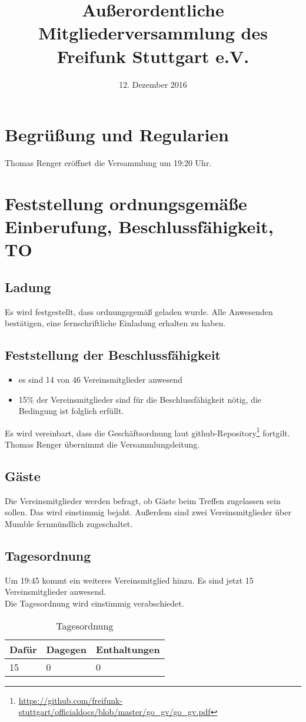 \documentclass[a4paper]{scrartcl}
\date{12. Dezember 2016}
\title{Außerordentliche Mitgliederversammlung des Freifunk Stuttgart e.V.}
\begin{document}
\maketitle

\tableofcontents

\clearpage

\listoftables

\clearpage

\section{Begrüßung und Regularien}
Thomas Renger eröffnet die Versammlung um 19:20 Uhr.

\section{Feststellung ordnungsgemäße Einberufung, Beschlussfähigkeit, TO}
\subsection{Ladung}
Es wird festgestellt, dass ordnungsgemäß geladen wurde. Alle Anwesenden bestätigen, eine fernschriftliche Einladung erhalten zu haben.

\subsection{Feststellung der Beschlussfähigkeit}
\begin{itemize}
\item es sind 14 von 46 Vereinsmitglieder anwesend
\item 15\% der Vereinsmitglieder sind für die Beschlussfähigkeit nötig, die Bedingung ist folglich erfüllt.
\end{itemize}
Es wird vereinbart, dass die Geschäftsordnung laut github-Repository\footnote{\url{https://github.com/freifunk-stuttgart/officialdocs/blob/master/go_gv/go_gv.pdf}} fortgilt. Thomas Renger übernimmt die Versammlungsleitung.

\subsection{Gäste} 
Die Vereinsmitglieder werden befragt, ob Gäste beim Treffen zugelassen sein sollen. Das wird einstimmig bejaht. Außerdem sind zwei Vereinsmitglieder über Mumble fernmündlich zugeschaltet.

\subsection{Tagesordnung}
Um 19:45 kommt ein weiteres Vereinsmitglied hinzu. Es sind jetzt 15 Vereinsmitglieder anwesend.\\
Die Tagesordnung wird einstimmig verabschiedet.\\
\begin{table}[h]
	\begin{tabularx}{\textwidth}{XXX}
		Dafür & Dagegen & Enthaltungen\\
		\toprule
		15 & 0 & 0\\
	\end{tabularx}
	\caption{Tagesordnung}
\end{table}
\end{document}
